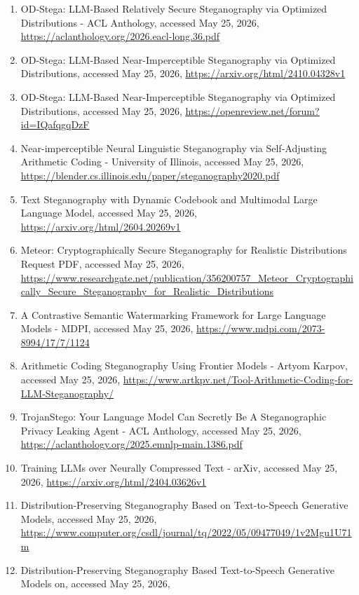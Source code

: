 \documentclass[
  11pt,
  a4paper,
]{article}
\begin{document}
\begin{enumerate}
  \url{https://aclanthology.org/2020.emnlp-main.22.pdf}
\item
  OD-Stega: LLM-Based Relatively Secure Steganography via Optimized Distributions - ACL Anthology, accessed May 25, 2026,
  \url{https://aclanthology.org/2026.eacl-long.36.pdf}
\item
  OD-Stega: LLM-Based Near-Imperceptible Steganography via Optimized Distributions, accessed May 25, 2026,
  \url{https://arxiv.org/html/2410.04328v1}
\item
  OD-Stega: LLM-Based Near-Imperceptible Steganography via Optimized Distributions, accessed May 25, 2026,
  \url{https://openreview.net/forum?id=IQafqgqDzF}
\item
  Near-imperceptible Neural Linguistic Steganography via Self-Adjusting Arithmetic Coding - University of Illinois, accessed May 25, 2026,
  \url{https://blender.cs.illinois.edu/paper/steganography2020.pdf}
\item
  Text Steganography with Dynamic Codebook and Multimodal Large Language Model, accessed May 25, 2026,
  \url{https://arxiv.org/html/2604.20269v1}
\item
  Meteor: Cryptographically Secure Steganography for Realistic Distributions \textbar{} Request PDF, accessed May 25, 2026,
  \url{https://www.researchgate.net/publication/356200757_Meteor_Cryptographically_Secure_Steganography_for_Realistic_Distributions}
\item
  A Contrastive Semantic Watermarking Framework for Large Language Models - MDPI, accessed May 25, 2026,
  \url{https://www.mdpi.com/2073-8994/17/7/1124}
\item
  Arithmetic Coding Steganography Using Frontier Models - \textbar{} Artyom Karpov, accessed May 25, 2026,
  \url{https://www.artkpv.net/Tool-Arithmetic-Coding-for-LLM-Steganography/}
\item
  TrojanStego: Your Language Model Can Secretly Be A Steganographic Privacy Leaking Agent - ACL Anthology, accessed May 25, 2026,
  \url{https://aclanthology.org/2025.emnlp-main.1386.pdf}
\item
  Training LLMs over Neurally Compressed Text - arXiv, accessed May 25,
  2026, \url{https://arxiv.org/html/2404.03626v1}
\item
  Distribution-Preserving Steganography Based on Text-to-Speech Generative Models, accessed May 25, 2026,
  \url{https://www.computer.org/csdl/journal/tq/2022/05/09477049/1v2Mgu1U71m}
\item
  Distribution-Preserving Steganography Based Text-to-Speech Generative Models on, accessed May 25, 2026,

\end{enumerate}
\end{document}
